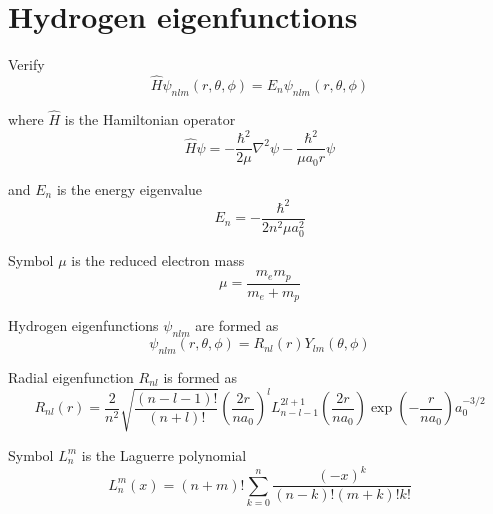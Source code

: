 

\section*{Hydrogen eigenfunctions}

Verify
\begin{equation*}
\hat H\psi_{nlm}(r,\theta,\phi)=E_n\psi_{nlm}(r,\theta,\phi)
\end{equation*}

where $\hat H$ is the Hamiltonian operator
\begin{equation*}
\hat H\psi=-\frac{\hbar^2}{2\mu}\nabla^2\psi-\frac{\hbar^2}{\mu a_0r}\psi
\end{equation*}

and $E_n$ is the energy eigenvalue
\begin{equation*}
E_n=-\frac{\hbar^2}{2n^2\mu a_0^2}
\end{equation*}

Symbol $\mu$ is the reduced electron mass
\begin{equation*}
\mu=\frac{m_e m_p}{m_e+m_p}
\end{equation*}

Hydrogen eigenfunctions $\psi_{nlm}$ are formed as
\begin{equation*}
\psi_{nlm}(r,\theta,\phi)=R_{nl}(r)Y_{lm}(\theta,\phi)
\end{equation*}

\iffalse
Quantum number $n$ is the principal quantum number.
\begin{equation*}
n=1,2,3,\ldots
\end{equation*}

Quantum number $l$ is the angular momentum quantum number.
\begin{equation*}
l=0,1,\ldots,n-1
\end{equation*}

Quantum number $m$ is the magnetic quantum number.
\begin{equation*}
m=-l,\ldots,0,\ldots,l
\end{equation*}
\fi

Radial eigenfunction $R_{nl}$ is formed as
\begin{equation*}
R_{nl}(r)=
\frac{2}{n^2}
\sqrt{\frac{(n-l-1)!}{(n+l)!}}
\left(\frac{2r}{na_0}\right)^l
L_{n-l-1}^{2l+1}\left(\frac{2r}{na_0}\right)
\exp\left(-\frac{r}{na_0}\right)
a_0^{-3/2}
\end{equation*}

Symbol $L_n^m$ is the Laguerre polynomial
\begin{equation*}
L_n^m(x)=(n+m)!\sum_{k=0}^n
\frac{(-x)^k}{(n-k)!(m+k)!k!}
\end{equation*}


